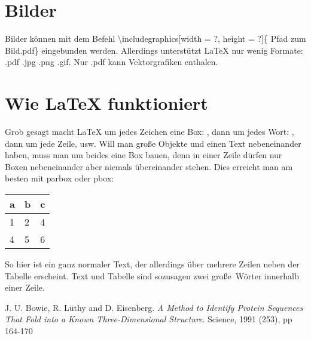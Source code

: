 	
\section{Bilder}
Bilder können mit dem Befehl \textbackslash includegraphics[width = ?, height = ?]\{ Pfad zum Bild.pdf\} eingebunden werden.		%
Allerdings unterstützt LaTeX nur wenig Formate: .pdf .jpg .png .gif.
Nur .pdf kann Vektorgrafiken enthalen. 		%



\section{Wie LaTeX funktioniert}
Grob gesagt macht \LaTeX{} um jedes Zeichen eine Box: , dann um jedes Wort: , dann um jede Zeile, usw.
Will man große Objekte und einen Text nebeneinander haben, muss man um beides eine Box bauen, denn in einer Zeile dürfen nur Boxen nebeneinander aber niemals übereinander stehen.
Dies erreicht man am besten mit parbox oder pbox:\\
\parbox{3.0cm}{
	\begin{tabular}{l||l|l}
	a & b & c \\ \hline \hline
	1 & 2 & 4 \\
	4 & 5 & 6 \\
	\end{tabular}
} 
\parbox{10cm}{So hier ist ein ganz normaler Text, der allerdings über mehrere Zeilen neben der Tabelle erscheint. Text und Tabelle sind sozusagen zwei \glqq große\grqq\ Wörter innerhalb einer Zeile.}



\begin{thebibliography}{------}
	J. U. Bowie, R. L\"uthy and D. Eisenberg.
	{\em A Method to Identify Protein Sequences That Fold 
	into a Known Three-Dimensional Structure}.
	Science, 1991 (253), pp 164-170
\end{thebibliography}



